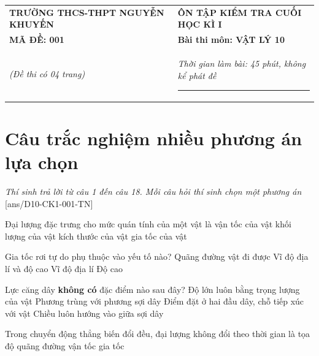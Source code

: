 \begin{center}
	\begin{tabular}{M{9.25cm}M{8.75cm}}
		\textbf{TRƯỜNG THCS-THPT NGUYỄN KHUYẾN}& \textbf{ÔN TẬP KIỂM TRA CUỐI HỌC KÌ I}\\
		\textbf{MÃ ĐỀ: 001}& \textbf{Bài thi môn: VẬT LÝ 10}\\
		\textit{(Đề thi có 04 trang)}& \textit{Thời gian làm bài: 45 phút, không kể phát đề}
		
		\noindent\rule{4cm}{0.8pt} \\
	\end{tabular}
\end{center}
\setcounter{section}{0}
\section{Câu trắc nghiệm nhiều phương án lựa chọn}
\textit{Thí sinh trả lời từ câu 1 đến câu 18. Mỗi câu hỏi thí sinh chọn một phương án}
\setcounter{ex}{0}
[ans/D10-CK1-001-TN]

\begin{ex}
	Đại lượng đặc trưng cho mức quán tính của một vật là
	\choice
	{vận tốc của vật}
	{\True khối lượng của vật}
	{kích thước của vật}
	{gia tốc của vật}
	\loigiai{}
\end{ex}
\begin{ex}
	Gia tốc rơi tự do phụ thuộc vào yếu tố nào?
	\choice
	{Quãng đường vật đi được}
	{\True Vĩ độ địa lí và độ cao}
	{Vĩ độ địa lí}
	{Độ cao}
	\loigiai{}
\end{ex}
\begin{ex}
	Lực căng dây \textbf{không có} đặc điểm nào sau đây?
	\choice
	{\True Độ lớn luôn bằng trọng lượng của vật}
	{Phương trùng với phương sợi dây}
	{Điểm đặt ở hai đầu dây, chỗ tiếp xúc với vật}
	{Chiều luôn hướng vào giữa sợi dây}
	\loigiai{}
\end{ex}
\begin{ex}
	Trong chuyển động thẳng biến đổi đều, đại lượng không đổi theo thời gian là
	\choice
	{tọa độ}
	{quãng đường}
	{vận tốc}
	{\True gia tốc}
	\loigiai{}
\end{ex}

